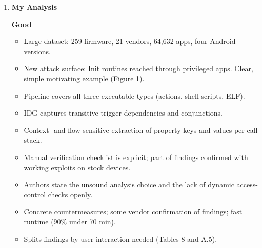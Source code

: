 \documentclass[11pt,a4paper]{article}
\newcommand{\entrypart}[1]{\textbf{\color{accent}#1}\par\vspace{2pt}}
\begin{document}
\begin{enumerate}
    \item \entrypart{My Analysis}

    \textbf{Good}
    \begin{itemize}[leftmargin=*, itemsep=1pt, topsep=2pt]
        \item Large dataset: 259 firmware, 21 vendors, 64,632 apps, four Android versions.
        \item New attack surface: Init routines reached through privileged apps. Clear, simple motivating example (Figure 1).
        \item Pipeline covers all three executable types (actions, shell scripts, ELF).
        \item IDG captures transitive trigger dependencies and conjunctions.
        \item Context- and flow-sensitive extraction of property keys and values per call stack.
        \item Manual verification checklist is explicit; part of findings confirmed with working exploits on stock devices.
        \item Authors state the unsound analysis choice and the lack of dynamic access-control checks openly.
        \item Concrete countermeasures; some vendor confirmation of findings; fast runtime (90\% under 70 min).
        \item Splits findings by user interaction needed (Tables 8 and A.5).
    \end{itemize}


\end{enumerate}
\end{document}
